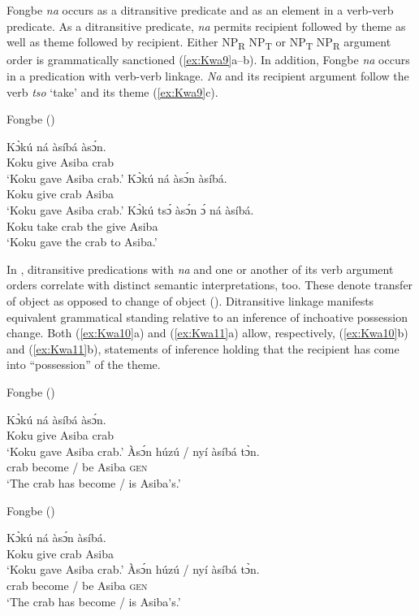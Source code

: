 \documentclass[output=paper,colorlinks,citecolor=brown]{langscibook}
\begin{document}
Fongbe \textit{na} occurs as a ditransitive predicate and as an element in a verb-verb predicate. As a ditransitive predicate, \textit{na} permits recipient followed by theme as well as theme followed by recipient. Either NP\textsubscript{R} NP\textsubscript{T} or NP\textsubscript{T} NP\textsubscript{R} argument order is grammatically sanctioned (\ref{ex:Kwa9}a--b). In addition, Fongbe \textit{na} occurs in a predication with verb-verb linkage. \textit{Na} and its recipient argument follow the verb \textit{tso} ‘take’ and its theme (\ref{ex:Kwa9}c).

\ea \label{ex:Kwa9} Fongbe (\citealt[447-448]{Lefebvre_Brousseau2002})
\begin{xlist}
\ex
\gll Kɔ̀kú		ná			àsíbá			àsɔ́n.\\
					Koku		give		Asiba			crab\\
\glt					‘Koku gave Asiba crab.’
\ex
\gll 	Kɔ̀kú		ná			àsɔ́n	àsíbá.\\
					Koku		give		crab		Asiba\\
\glt					‘Koku gave Asiba crab.’
\ex
\gll	Kɔ̀kú 		tsɔ́			àsɔ́n	ɔ́			ná 		àsíbá.\\
					Koku		take		crab		the	give Asiba\\
\glt					‘Koku gave the crab to Asiba.’
\end{xlist}
\z

In , ditransitive predications with \textit{na} and one or another of its verb argument orders correlate with distinct semantic interpretations, too. These denote transfer of object as opposed to  change of object (\citealt{Lefebvre_Brousseau2002}). Ditransitive linkage manifests equivalent grammatical standing relative to an inference of inchoative possession change. Both (\ref{ex:Kwa10}a) and (\ref{ex:Kwa11}a) allow, respectively, (\ref{ex:Kwa10}b) and (\ref{ex:Kwa11}b), statements of inference holding that the recipient has come into “possession” of the theme.\largerpage[-2]

\ea \label{ex:Kwa10} Fongbe (\citealt[447]{Lefebvre_Brousseau2002})
\begin{xlist}
\ex
\gll Kɔ̀kú		ná			àsíbá		àsɔ́n.\\
	 Koku		give		Asiba		crab\\
\glt ‘Koku gave Asiba crab.’
\ex
\gll	Àsɔ́n	húzú		/		nyí		àsíbá		tɔ̀n.\\
	crab		become	/	be			Asiba		\textsc{gen} \\
\glt ‘The crab has become / is Asiba’s.’
\end{xlist}
\ex \label{ex:Kwa11} Fongbe (\citealt[447]{Lefebvre_Brousseau2002})
\begin{xlist}
\ex
\gll Kɔ̀kú		ná			àsɔ́n	àsíbá.\\
	 Koku		give		crab		Asiba\\
\glt ‘Koku gave Asiba crab.’
\ex
\gll 	Àsɔ́n	húzú		/		nyí		àsíbá		tɔ̀n.\\
		crab		become	/	be			Asiba	\textsc{gen}\\
\glt    ‘The crab has become / is Asiba’s.’
\end{xlist}
\z
\end{document}
